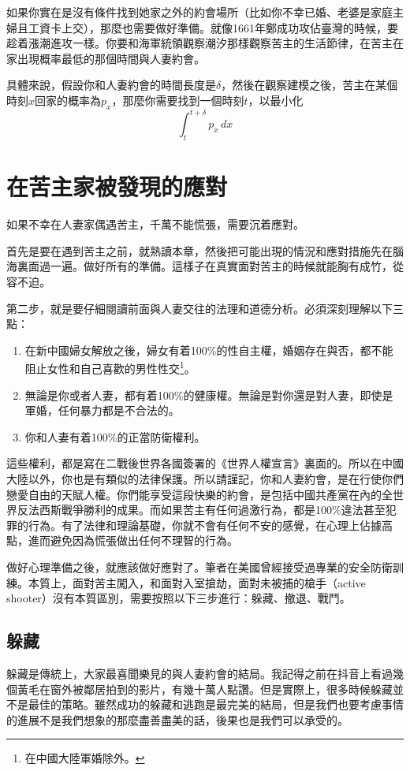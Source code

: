 如果你實在是沒有條件找到她家之外的約會場所（比如你不幸已婚、老婆是家庭主婦且工資卡上交），那麼也需要做好準備。就像1661年鄭成功攻佔臺灣的時候，要趁着漲潮進攻一樣。你要和海軍統領觀察潮汐那樣觀察苦主的生活節律，在苦主在家出現概率最低的那個時間與人妻約會。

具體來說，假設你和人妻約會的時間長度是$\delta$，然後在觀察建模之後，苦主在某個時刻$x$回家的概率為$p_x$，那麼你需要找到一個時刻$t$，以最小化$$\int_{t}^{t+\delta}p_x \,dx$$

\section{在苦主家被發現的應對}

如果不幸在人妻家偶遇苦主，千萬不能慌張，需要沉着應對。

首先是要在遇到苦主之前，就熟讀本章，然後把可能出現的情況和應對措施先在腦海裏面過一遍。做好所有的準備。這樣子在真實面對苦主的時候就能胸有成竹，從容不迫。

第二步，就是要仔細閱讀前面與人妻交往的法理和道德分析。必須深刻理解以下三點：
\begin{enumerate}
\item 在新中國婦女解放之後，婦女有着100\%的性自主權，婚姻存在與否，都不能阻止女性和自己喜歡的男性性交\footnote{在中國大陸軍婚除外。}。
\item 無論是你或者人妻，都有着100\%的健康權。無論是對你還是對人妻，即使是軍婚，任何暴力都是不合法的。
\item 你和人妻有着100\%的正當防衛權利。
\end{enumerate}

這些權利，都是寫在二戰後世界各國簽署的《世界人權宣言》裏面的。所以在中國大陸以外，你也是有類似的法律保護。所以請謹記，你和人妻約會，是在行使你們戀愛自由的天賦人權。你們能享受這段快樂的約會，是包括中國共產黨在內的全世界反法西斯戰爭勝利的成果。而如果苦主有任何過激行為，都是100\%違法甚至犯罪的行為。有了法律和理論基礎，你就不會有任何不安的感覺，在心理上佔據高點，進而避免因為慌張做出任何不理智的行為。

做好心理準備之後，就應該做好應對了。筆者在美國曾經接受過專業的安全防衛訓練。本質上，面對苦主闖入，和面對入室搶劫，面對未被捕的槍手（active shooter）沒有本質區別，需要按照以下三步進行：躲藏、撤退、戰鬥。

\subsection{躲藏}

躲藏是傳統上，大家最喜聞樂見的與人妻約會的結局。我記得之前在抖音上看過幾個黃毛在窗外被鄰居拍到的影片，有幾十萬人點讚。但是實際上，很多時候躲藏並不是最佳的策略。雖然成功的躲藏和逃跑是最完美的結局，但是我們也要考慮事情的進展不是我們想象的那麼盡善盡美的話，後果也是我們可以承受的。

